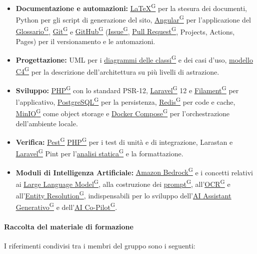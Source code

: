 \documentclass[a4paper,12pt]{article}
\providecommand{\glslink}[2]{\href{https://alittlebyte-19.github.io/Documentazione/glossario.html\#gls-#1}{\underline{#2}\textsuperscript{\scriptsize G}}}
\begin{document}
\begin{itemize}
    \item \textbf{Documentazione e automazioni:} \glslink{latex}{LaTeX} per la stesura dei documenti, Python per gli script di generazione del sito, \glslink{angular}{Angular} per l'applicazione del \glslink{glossario}{Glossario}, \glslink{git}{Git} e \glslink{github}{GitHub} (\glslink{issue}{Issue}, \glslink{pull-request}{Pull Request}, Projects, Actions, Pages) per il versionamento e le automazioni.
    \item \textbf{Progettazione:} UML per i \glslink{diagramma-delle-classi-uml}{diagrammi delle classi} e dei casi d'uso, \glslink{modello-c4}{modello C4} per la descrizione dell'architettura su più livelli di astrazione.
    \item \textbf{Sviluppo:} \glslink{php}{PHP} con lo standard PSR-12, \glslink{laravel}{Laravel} 12 e \glslink{filament}{Filament} per l'applicativo, \glslink{postgresql}{PostgreSQL} per la persistenza, \glslink{redis}{Redis} per code e cache, \glslink{minio}{MinIO} come object storage e \glslink{docker-compose}{Docker Compose} per l'orchestrazione dell'ambiente locale.
    \item \textbf{Verifica:} \glslink{pest}{Pest} \glslink{php}{PHP} per i test di unità e di integrazione, Larastan e \glslink{laravel}{Laravel} Pint per l'\glslink{analisi-statica}{analisi statica} e la formattazione.
    \item \textbf{Moduli di Intelligenza Artificiale:} \glslink{amazon-bedrock}{Amazon Bedrock} e i concetti relativi ai \glslink{llm-large-language-model}{Large Language Model}, alla costruzione dei \glslink{prompt}{prompt}, all'\glslink{ocr-riconoscimento-ottico-dei-caratteri}{OCR} e all'\glslink{entity-resolution}{Entity Resolution}, indispensabili per lo sviluppo dell'\glslink{ai-assistant-generativo}{AI Assistant Generativo} e dell'\glslink{ai-co-pilot-per-consulenti-del-lavoro-cdl}{AI Co-Pilot}.
\end{itemize}

\paragraph{Raccolta del materiale di formazione}
I riferimenti condivisi tra i membri del gruppo sono i seguenti:
\end{document}
